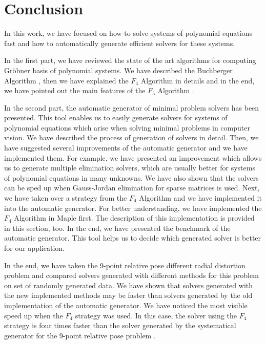 \chapter{Conclusion}
In this work, we have focused on how to solve systems of polynomial equations fast and how to automatically generate efficient solvers for these systems.

In the first part, we have reviewed the state of the art algorithms for computing Gr\"obner basis of polynomial systems. We have described the Buchberger Algorithm \cite{Buchberger65}, then we have explained the $F_4$ Algorithm \cite{F4} in details and in the end, we have pointed out the main features of the $F_5$ Algorithm \cite{F5}.

In the second part, the automatic generator \cite{AutoGen} of minimal problem solvers has been presented. This tool enables us to easily generate solvers for systems of polynomial equations which arise when solving minimal problems in computer vision. We have described the process of generation of solvers in detail. Then, we have suggested several improvements of the automatic generator and we have implemented them. For example, we have presented an improvement which allows us to generate multiple elimination solvers, which are usually better for systems of polynomial equations in many unknowns. We have also shown that the solvers can be sped up when Gauss-Jordan elimination for sparse matrices is used. Next, we have taken over a strategy from the $F_4$ Algorithm \cite{F4} and we have implemented it into the automatic generator. For better understanding, we have implemented the $F_4$ Algorithm \cite{F4} in Maple first. The description of this implementation is provided in this section, too. In the end, we have presented the benchmark of the automatic generator. This tool helps us to decide which generated solver is better for our application.

In the end, we have taken the 9-point relative pose different radial distortion problem \cite{9pt} and compared solvers generated with different methods for this problem on set of randomly generated data. We have shown that solvers generated with the new implemented methods may be faster than solvers generated by the old implementation of the automatic generator. We have noticed the most visible speed up when the $F_4$ strategy was used. In this case, the solver using the $F_4$ strategy is four times faster than the solver generated by the systematical generator for the 9-point relative pose problem \cite{9pt}.
